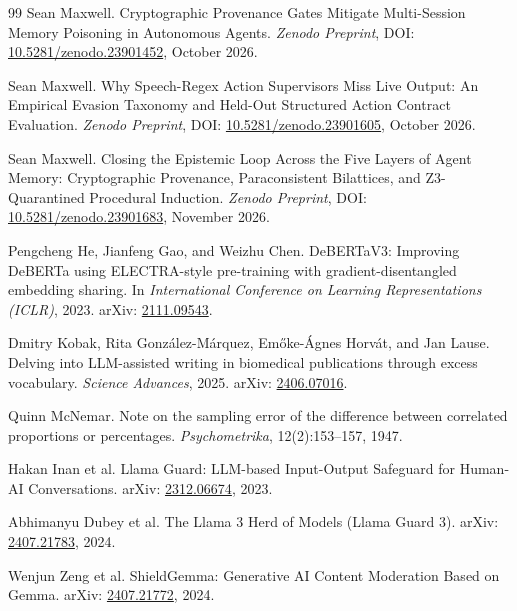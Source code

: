 \documentclass[11pt,a4paper]{article}
\begin{document}

\begin{thebibliography}{99}
Sean Maxwell.
\newblock Cryptographic Provenance Gates Mitigate Multi-Session Memory Poisoning in Autonomous Agents.
\newblock \emph{Zenodo Preprint}, DOI: \href{https://doi.org/10.5281/zenodo.23901452}{10.5281/zenodo.23901452}, October 2026.

Sean Maxwell.
\newblock Why Speech-Regex Action Supervisors Miss Live Output: An Empirical Evasion Taxonomy and Held-Out Structured Action Contract Evaluation.
\newblock \emph{Zenodo Preprint}, DOI: \href{https://doi.org/10.5281/zenodo.23901605}{10.5281/zenodo.23901605}, October 2026.

Sean Maxwell.
\newblock Closing the Epistemic Loop Across the Five Layers of Agent Memory: Cryptographic Provenance, Paraconsistent Bilattices, and Z3-Quarantined Procedural Induction.
\newblock \emph{Zenodo Preprint}, DOI: \href{https://doi.org/10.5281/zenodo.23901683}{10.5281/zenodo.23901683}, November 2026.

Pengcheng He, Jianfeng Gao, and Weizhu Chen.
\newblock DeBERTaV3: Improving DeBERTa using ELECTRA-style pre-training with gradient-disentangled embedding sharing.
\newblock In \emph{International Conference on Learning Representations (ICLR)}, 2023. arXiv: \href{https://arxiv.org/abs/2111.09543}{2111.09543}.

Dmitry Kobak, Rita González-Márquez, Emőke-Ágnes Horvát, and Jan Lause.
\newblock Delving into LLM-assisted writing in biomedical publications through excess vocabulary.
\newblock \emph{Science Advances}, 2025. arXiv: \href{https://arxiv.org/abs/2406.07016}{2406.07016}.

Quinn McNemar.
\newblock Note on the sampling error of the difference between correlated proportions or percentages.
\newblock \emph{Psychometrika}, 12(2):153--157, 1947.

Hakan Inan et al.
\newblock Llama Guard: LLM-based Input-Output Safeguard for Human-AI Conversations.
\newblock arXiv: \href{https://arxiv.org/abs/2312.06674}{2312.06674}, 2023.

Abhimanyu Dubey et al.
\newblock The Llama 3 Herd of Models (Llama Guard 3).
\newblock arXiv: \href{https://arxiv.org/abs/2407.21783}{2407.21783}, 2024.

Wenjun Zeng et al.
\newblock ShieldGemma: Generative AI Content Moderation Based on Gemma.
\newblock arXiv: \href{https://arxiv.org/abs/2407.21772}{2407.21772}, 2024.


\end{thebibliography}
\end{document}
